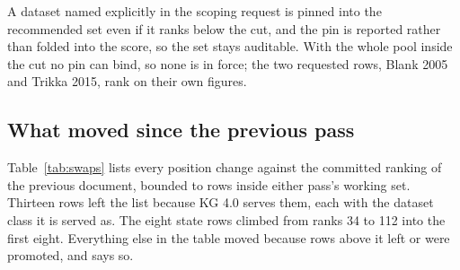 

A dataset named explicitly in the scoping request is pinned into the recommended set even
if it ranks below the cut, and the pin is reported rather than folded into the score, so
the set stays auditable. With the whole pool inside the cut no pin can bind, so none is
in force; the two requested rows, Blank 2005 and Trikka 2015, rank on their own figures.

\subsection{What moved since the previous pass}\label{sec:moves}

Table~\ref{tab:swaps} lists every position change against the committed ranking of the
previous document, bounded to rows inside either pass's working set. Thirteen rows left
the list because KG 4.0 serves them, each with the dataset class it is served as. The
eight state rows climbed from ranks 34 to 112 into the first eight. Everything else in the
table moved because rows above it left or were promoted, and says so.


